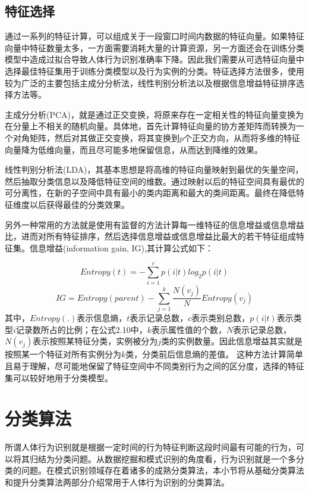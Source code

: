 \subsection{特征选择}
\par 通过一系列的特征计算，可以组成关于一段窗口时间内数据的特征向量。如果特征向量中特征数量太多，一方面需要消耗大量的计算资源，另一方面还会在训练分类模型中造成过拟合导致人体行为识别准确率下降。因此我们需要从可选特征向量中选择最佳特征集用于训练分类模型以及行为实例的分类。特征选择方法很多，使用较为广泛的主要包括主成分分析法，线性判别分析法以及根据信息增益特征排序选择方法等。
\par 主成分分析(PCA)，就是通过正交变换，将原来存在一定相关性的特征向量变换为在分量上不相关的随机向量。具体地，首先计算特征向量的协方差矩阵而转换为一个对角矩阵，然后对其做正交变换，将其变换到$p$个正交方向，从而将多维的特征向量降为低维向量，而且尽可能多地保留信息，从而达到降维的效果。
\par 线性判别分析法(LDA)，其基本思想是将高维的特征向量映射到最优的矢量空间，然后抽取分类信息以及降低特征空间的维数。通过映射以后的特征空间具有最优的可分离性，在新的子空间中具有最小的类内距离和最大的类间距离。最终在降低特征维度以后获得最佳的分类效果。
\par 另外一种常用的方法就是使用有监督的方法计算每一维特征的信息增益或信息增益比，进而对所有特征排序，然后选择信息增益或信息增益比最大的若干特征组成特征集。信息增益(information gain, IG),其计算公式如下：

\begin{equation}
	Entropy(t) = -\sum_{i=1}^{c}p(i|t)log_2p(i|t)
\end{equation}
\begin{equation}
	IG = Entropy(parent) - \sum_{j=1}^{k}\frac{N(v_j)}{N}Entropy(v_j)
\end{equation}
其中，$Entropy(.)$表示信息熵，$t$表示记录总数，$c$表示类别总数，$p(i|t)$表示类型$i$记录数所占的比例；在公式2.10中，$k$表示属性值的个数，$N$表示记录总数，$N(v_j)$表示按照某特征分类，实例被分为$j$类的实例数量。因此信息增益其实就是按照某一个特征对所有实例分为$k$类，分类前后信息熵的差值。
这种方法计算简单且易于理解，尽可能地保留了特征空间中不同类别行为之间的区分度，选择的特征集可以较好地用于分类模型。

\section{分类算法}
\par 所谓人体行为识别就是根据一定时间的行为特征判断这段时间最有可能的行为，可以将其归结为分类问题。从数据挖掘和模式识别的角度看，行为识别就是一个多分类的问题。在模式识别领域存在着诸多的成熟分类算法，本小节将从基础分类算法和提升分类算法两部分介绍常用于人体行为识别的分类算法。

